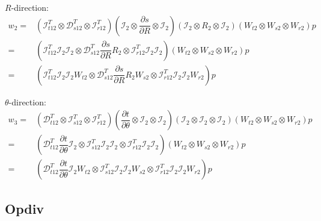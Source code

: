 \documentclass{kthreport}
\begin{document}
$R$-direction:
\begin{subequations}
	\begin{eqnarray}
		w_{2}	=& (\mathcal{I}^{T}_{t12}\otimes\mathcal{D}^{T}_{s12}\otimes\mathcal{I}^{T}_{r12})(\mathcal{I}_{2}\otimes\dfrac{\partial s}{\partial R}\otimes\mathcal{I}_{2})(\mathcal{I}_{2}\otimes R_{2}\otimes\mathcal{I}_{2})(W_{t2}\otimes W_{s2}\otimes W_{r2})p \\
					  =& (\mathcal{I}^{T}_{t12}\mathcal{I}_{2}\mathcal{I}_{2}\otimes\mathcal{D}^{T}_{s12}\dfrac{\partial s}{\partial R}R_{2}\otimes\mathcal{I}^{T}_{r12}\mathcal{I}_{2}\mathcal{I}_{2})(W_{t2}\otimes W_{s2}\otimes W_{r2})p \\
					  =& (\mathcal{I}^{T}_{t12}\mathcal{I}_{2}\mathcal{I}_{2}W_{t2}\otimes\mathcal{D}^{T}_{s12}\dfrac{\partial s}{\partial R}R_{2}W_{s2}\otimes\mathcal{I}^{T}_{r12}\mathcal{I}_{2}\mathcal{I}_{2}W_{r2})p
	\end{eqnarray}
\end{subequations}

$\theta$-direction:
\begin{subequations}
	\begin{eqnarray}
		w_{3}	=& (\mathcal{D}^{T}_{t12}\otimes\mathcal{I}^{T}_{s12}\otimes\mathcal{I}^{T}_{r12})(\dfrac{\partial t}{\partial \theta}\otimes\mathcal{I}_{2}\otimes\mathcal{I}_{2})(\mathcal{I}_{2}\otimes \mathcal{I}_{2}\otimes\mathcal{I}_{2})(W_{t2}\otimes W_{s2}\otimes W_{r2})p \\
=& (\mathcal{D}^{T}_{t12}\dfrac{\partial t}{\partial \theta}\mathcal{I}_{2}\otimes\mathcal{I}^{T}_{s12}\mathcal{I}_{2}\mathcal{I}_{2}\otimes\mathcal{I}^{T}_{r12}\mathcal{I}_{2}\mathcal{I}_{2})(W_{t2}\otimes W_{s2}\otimes W_{r2})p \\
=& (\mathcal{D}^{T}_{t12}\dfrac{\partial t}{\partial \theta}\mathcal{I}_{2}W_{t2}\otimes\mathcal{I}^{T}_{s12}\mathcal{I}_{2}\mathcal{I}_{2}W_{s2}\otimes\mathcal{I}^{T}_{r12}\mathcal{I}_{2}\mathcal{I}_{2}W_{r2})p
	\end{eqnarray}
\end{subequations}

\subsection{Opdiv}
\end{document}
